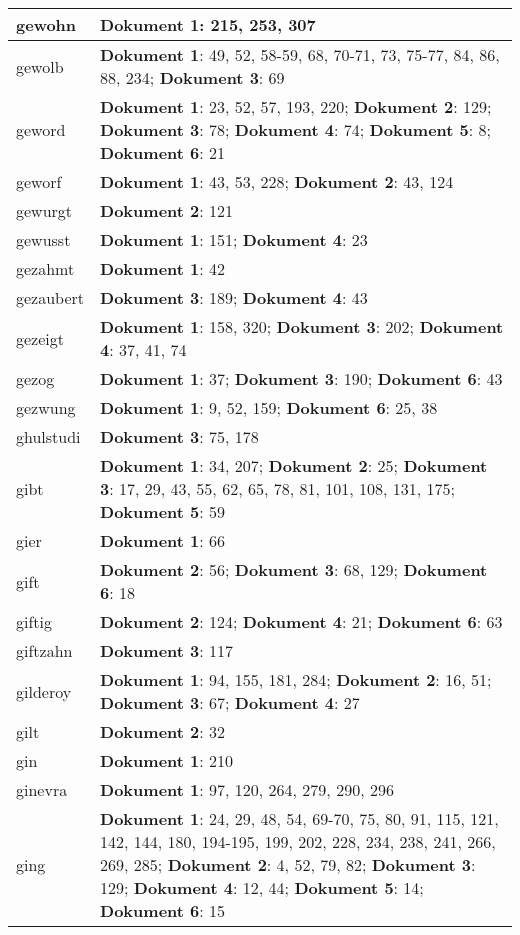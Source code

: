 \documentclass[a5paper]{article}
\begin{document}
\begin{longtable}[l]{|l|p{3in}|}
\hline
gewohn & \textbf{Dokument 1}: 215, 253, 307 \\
\hline
gewolb & \textbf{Dokument 1}: 49, 52, 58-59, 68, 70-71, 73, 75-77, 84, 86, 88, 234; \textbf{Dokument 3}: 69 \\
\hline
geword & \textbf{Dokument 1}: 23, 52, 57, 193, 220; \textbf{Dokument 2}: 129; \textbf{Dokument 3}: 78; \textbf{Dokument 4}: 74; \textbf{Dokument 5}: 8; \textbf{Dokument 6}: 21 \\
\hline
geworf & \textbf{Dokument 1}: 43, 53, 228; \textbf{Dokument 2}: 43, 124 \\
\hline
gewurgt & \textbf{Dokument 2}: 121 \\
\hline
gewusst & \textbf{Dokument 1}: 151; \textbf{Dokument 4}: 23 \\
\hline
gezahmt & \textbf{Dokument 1}: 42 \\
\hline
gezaubert & \textbf{Dokument 3}: 189; \textbf{Dokument 4}: 43 \\
\hline
gezeigt & \textbf{Dokument 1}: 158, 320; \textbf{Dokument 3}: 202; \textbf{Dokument 4}: 37, 41, 74 \\
\hline
gezog & \textbf{Dokument 1}: 37; \textbf{Dokument 3}: 190; \textbf{Dokument 6}: 43 \\
\hline
gezwung & \textbf{Dokument 1}: 9, 52, 159; \textbf{Dokument 6}: 25, 38 \\
\hline
ghulstudi & \textbf{Dokument 3}: 75, 178 \\
\hline
gibt & \textbf{Dokument 1}: 34, 207; \textbf{Dokument 2}: 25; \textbf{Dokument 3}: 17, 29, 43, 55, 62, 65, 78, 81, 101, 108, 131, 175; \textbf{Dokument 5}: 59 \\
\hline
gier & \textbf{Dokument 1}: 66 \\
\hline
gift & \textbf{Dokument 2}: 56; \textbf{Dokument 3}: 68, 129; \textbf{Dokument 6}: 18 \\
\hline
giftig & \textbf{Dokument 2}: 124; \textbf{Dokument 4}: 21; \textbf{Dokument 6}: 63 \\
\hline
giftzahn & \textbf{Dokument 3}: 117 \\
\hline
gilderoy & \textbf{Dokument 1}: 94, 155, 181, 284; \textbf{Dokument 2}: 16, 51; \textbf{Dokument 3}: 67; \textbf{Dokument 4}: 27 \\
\hline
gilt & \textbf{Dokument 2}: 32 \\
\hline
gin & \textbf{Dokument 1}: 210 \\
\hline
ginevra & \textbf{Dokument 1}: 97, 120, 264, 279, 290, 296 \\
\hline
ging & \textbf{Dokument 1}: 24, 29, 48, 54, 69-70, 75, 80, 91, 115, 121, 142, 144, 180, 194-195, 199, 202, 228, 234, 238, 241, 266, 269, 285; \textbf{Dokument 2}: 4, 52, 79, 82; \textbf{Dokument 3}: 129; \textbf{Dokument 4}: 12, 44; \textbf{Dokument 5}: 14; \textbf{Dokument 6}: 15 \\

\end{longtable}
\end{document}
